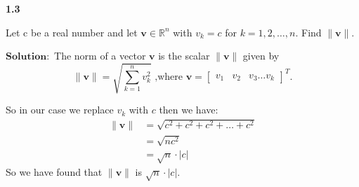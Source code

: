 \documentclass[12pt]{article}
\begin{document}
    
    \textbf{1.3}  
    
        Let c be a real number and let $\mathbf{v} \in \mathbb{R}^n$ with $v_k = c$ for $k = 1,2, \dots ,n.$ Find $\|\mathbf{v}\|$.
    
    
        
            $\textbf{Solution}:$ The norm of a vector $\mathbf{v}$ is the scalar $\|  \mathbf{v} \|$ given by   
            $$\|  \mathbf{v} \| = \sqrt{\sum_{k=1}^{n}v_k^2} \text{ ,where } \mathbf{v} = \begin{bmatrix}v_1  &v_2& v_3 \dots v_k
               \end{bmatrix}^{T}.  $$
            
            So in our case we replace $v_k$ with $c$ then we have:
            \begin{align*}
                \|  \mathbf{v} \|& = \sqrt{c^2 + c^2 + c^2 + \dots +c^2}\\
                & = \sqrt{nc^2}\\
                & = \sqrt{n} \cdot \lvert c\rvert
            \end{align*}
            So we have found that $\|\mathbf{v}\|$ is $\sqrt{n} \cdot \lvert c\rvert$.
\end{document}
